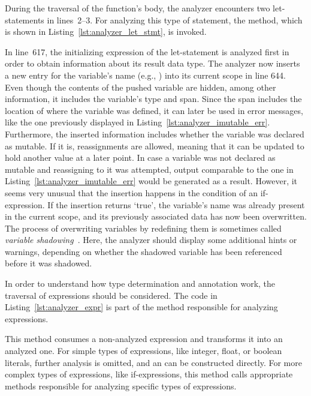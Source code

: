 During the traversal of the  function's body, the analyzer encounters two let-statements in lines~2--3.
For analyzing this type of statement, the  method, which is shown in Listing~\ref{lst:analyzer_let_stmt}, is invoked.


In line~617, the initializing expression of the let-statement is analyzed first in order to obtain information about its result data type.
The analyzer now inserts a new entry for the variable's name (e.g., ) into its current scope in line 644.
Even though the contents of the pushed variable are hidden, among other information, it includes the variable's type and span.
Since the span includes the location of where the variable was defined, it can later be used in error messages, like the one previously displayed in Listing~\ref{lst:analyzer_imutable_err}.
Furthermore, the inserted information includes whether the variable was declared as mutable.
If it is, reassignments are allowed, meaning that it can be updated to hold another value at a later point.
In case a variable was not declared as mutable and reassigning to it was attempted,
output comparable to the one in Listing~\ref{lst:analyzer_imutable_err} would be generated as a result.
However, it seems very unusual that the insertion happens in the condition of an if-expression.
If the insertion returns `true', the variable's name was already present in the current scope, and its previously associated data has now been overwritten.
The process of overwriting variables by redefining them is sometimes called \emph{variable shadowing}~\cite[p.~34]{Klabnik2019}.
Here, the analyzer should display some additional hints or warnings, depending on whether the shadowed variable has been referenced before it was shadowed.

In order to understand how type determination and annotation work, the traversal of expressions should be considered.
The code in Listing~\ref{lst:analyzer_expr} is part of the method responsible for analyzing expressions.


This method consumes a non-analyzed expression and transforms it into an analyzed one.
For simple types of expressions, like integer, float, or boolean literals, further analysis is omitted, and an  can be constructed directly.
For more complex types of expressions, like if-expressions, this method calls appropriate methods responsible for analyzing specific types of expressions.

